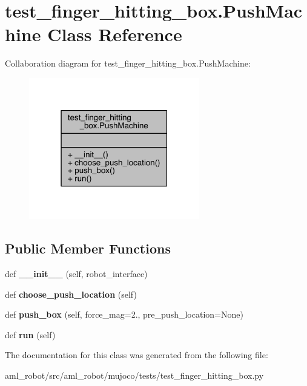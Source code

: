 \hypertarget{classtest__finger__hitting__box_1_1_push_machine}{}\section{test\+\_\+finger\+\_\+hitting\+\_\+box.\+Push\+Machine Class Reference}
\label{classtest__finger__hitting__box_1_1_push_machine}


Collaboration diagram for test\+\_\+finger\+\_\+hitting\+\_\+box.\+Push\+Machine\+:\nopagebreak
\begin{figure}[H]
\begin{center}
\leavevmode
\includegraphics[width=211pt]{classtest__finger__hitting__box_1_1_push_machine__coll__graph}
\end{center}
\end{figure}
\subsection*{Public Member Functions}
\begin{DoxyCompactItemize}
\item 
\hypertarget{classtest__finger__hitting__box_1_1_push_machine_aa58906be56f5201a386d876c2b9856ed}{}\label{classtest__finger__hitting__box_1_1_push_machine_aa58906be56f5201a386d876c2b9856ed} 
def {\bfseries \+\_\+\+\_\+init\+\_\+\+\_\+} (self, robot\+\_\+interface)
\item 
\hypertarget{classtest__finger__hitting__box_1_1_push_machine_a8b88d9ed266d021b4228ad51b26a303c}{}\label{classtest__finger__hitting__box_1_1_push_machine_a8b88d9ed266d021b4228ad51b26a303c} 
def {\bfseries choose\+\_\+push\+\_\+location} (self)
\item 
\hypertarget{classtest__finger__hitting__box_1_1_push_machine_a25e4b9e093b8cb51b3948705ffaea39c}{}\label{classtest__finger__hitting__box_1_1_push_machine_a25e4b9e093b8cb51b3948705ffaea39c} 
def {\bfseries push\+\_\+box} (self, force\+\_\+mag=2., pre\+\_\+push\+\_\+location=None)
\item 
\hypertarget{classtest__finger__hitting__box_1_1_push_machine_a7f4c556206df679857fe4dd7130389d0}{}\label{classtest__finger__hitting__box_1_1_push_machine_a7f4c556206df679857fe4dd7130389d0} 
def {\bfseries run} (self)
\end{DoxyCompactItemize}


The documentation for this class was generated from the following file\+:\begin{DoxyCompactItemize}
\item 
aml\+\_\+robot/src/aml\+\_\+robot/mujoco/tests/test\+\_\+finger\+\_\+hitting\+\_\+box.\+py\end{DoxyCompactItemize}
